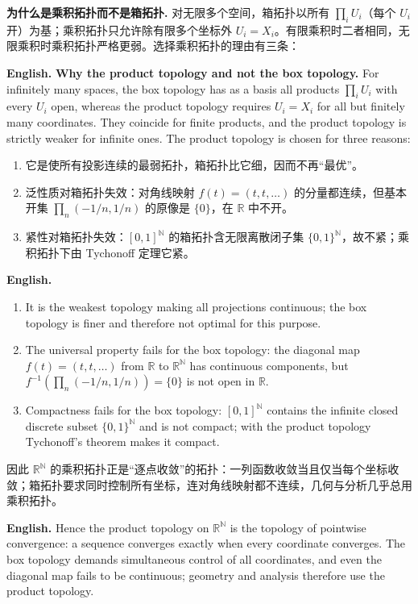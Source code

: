 \documentclass[UTF8,11pt,a4paper]{ctexart}
\newcommand{\EN}[1]{\par\noindent\textbf{English.} #1\par}
\begin{document}
\noindent\textbf{为什么是乘积拓扑而不是箱拓扑.} 对无限多个空间，箱拓扑以所有 $\prod_iU_i$（每个 $U_i$ 开）为基；乘积拓扑只允许除有限多个坐标外 $U_i=X_i$。有限乘积时二者相同，无限乘积时乘积拓扑严格更弱。选择乘积拓扑的理由有三条：
\EN{\textbf{Why the product topology and not the box topology.} For infinitely many spaces, the box topology has as a basis all products $\prod_iU_i$ with every $U_i$ open, whereas the product topology requires $U_i=X_i$ for all but finitely many coordinates. They coincide for finite products, and the product topology is strictly weaker for infinite ones. The product topology is chosen for three reasons:}
\begin{enumerate}[leftmargin=2em,label=(\arabic*)]
\item 它是使所有投影连续的最弱拓扑，箱拓扑比它细，因而不再“最优”。
\item 泛性质对箱拓扑失效：对角线映射 $f(t)=(t,t,\dots)$ 的分量都连续，但基本开集 $\prod_n(-1/n,1/n)$ 的原像是 $\{0\}$，在 $\mathbb R$ 中不开。
\item 紧性对箱拓扑失效：$[0,1]^{\mathbb N}$ 的箱拓扑含无限离散闭子集 $\{0,1\}^{\mathbb N}$，故不紧；乘积拓扑下由 Tychonoff 定理它紧。
\end{enumerate}
\EN{\begin{enumerate}[leftmargin=2em,label=(\arabic*)]
\item It is the weakest topology making all projections continuous; the box topology is finer and therefore not optimal for this purpose.
\item The universal property fails for the box topology: the diagonal map $f(t)=(t,t,\dots)$ from $\mathbb R$ to $\mathbb R^{\mathbb N}$ has continuous components, but $f^{-1}(\prod_n(-1/n,1/n))=\{0\}$ is not open in $\mathbb R$.
\item Compactness fails for the box topology: $[0,1]^{\mathbb N}$ contains the infinite closed discrete subset $\{0,1\}^{\mathbb N}$ and is not compact; with the product topology Tychonoff's theorem makes it compact.
\end{enumerate}}
\noindent 因此 $\mathbb R^{\mathbb N}$ 的乘积拓扑正是“逐点收敛”的拓扑：一列函数收敛当且仅当每个坐标收敛；箱拓扑要求同时控制所有坐标，连对角线映射都不连续，几何与分析几乎总用乘积拓扑。
\EN{Hence the product topology on $\mathbb R^{\mathbb N}$ is the topology of pointwise convergence: a sequence converges exactly when every coordinate converges. The box topology demands simultaneous control of all coordinates, and even the diagonal map fails to be continuous; geometry and analysis therefore use the product topology.}
\end{document}
